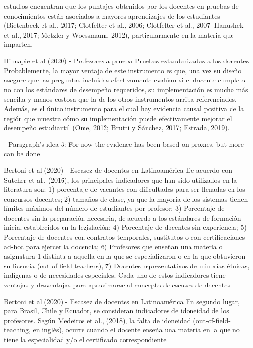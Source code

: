 estudios encuentran que los puntajes obtenidos por los docentes en pruebas de conocimientos están asociados a mayores aprendizajes de los estudiantes (Bietenbeck et al., 2017; Clotfelter et al., 2006; Clotfelter et al., 2007; Hanushek et al., 2017; Metzler y Woessmann, 2012), particularmente en la materia que imparten.


Hincapie et al (2020) - Profesores a prueba
Pruebas estandarizadas a los docentes
Probablemente, la mayor ventaja de este instrumento es que, una vez su diseño asegure que las preguntas incluidas efectivamente evalúan si el docente cumple o no con los estándares de desempeño requeridos, su implementación es mucho más sencilla y menos costosa que la de los otros instrumentos arriba referenciados. Además, es el único instrumento para el cual hay evidencia causal positiva de la región que muestra cómo su implementación puede efectivamente mejorar el desempeño estudiantil (Ome, 2012; Brutti y Sánchez, 2017; Estrada, 2019).



- Paragraph's idea 3: For now the evidence has been based on proxies, but more can be done

Bertoni et al (2020) - Escasez de docentes en Latinoamérica
De acuerdo con Sutcher et al., (2016), los principales indicadores que han sido utilizados en la literatura son: 1) porcentaje de vacantes con dificultades para ser llenadas en los concursos docentes; 2) tamaños de clase, ya que la mayoría de los sistemas tienen límites máximos del número de estudiantes por profesor; 3) Porcentaje de docentes sin la preparación necesaria, de acuerdo a los estándares de formación inicial establecidos en la legislación; 4) Porcentaje de docentes sin experiencia; 5) Porcentaje de docentes con contratos temporales, sustitutos o con certificaciones ad-hoc para ejercer la docencia; 6) Profesores que enseñan una materia o asignatura 1 distinta a aquella en la que se especializaron o en la que obtuvieron su licencia (out of field teachers); 7) Docentes representativos de minorías étnicas, indígenas o de necesidades especiales. Cada uno de estos indicadores tiene ventajas y desventajas para aproximarse al concepto de escasez de docentes.

Bertoni et al (2020) - Escasez de docentes en Latinoamérica
En segundo lugar, para Brasil, Chile y Ecuador, se consideran indicadores de idoneidad de los profesores. Según Medeiros et al., (2018), la falta de idoneidad (out-of-field-teaching, en inglés), ocurre cuando el docente enseña una materia en la que no tiene la especialidad y/o el certificado correspondiente

